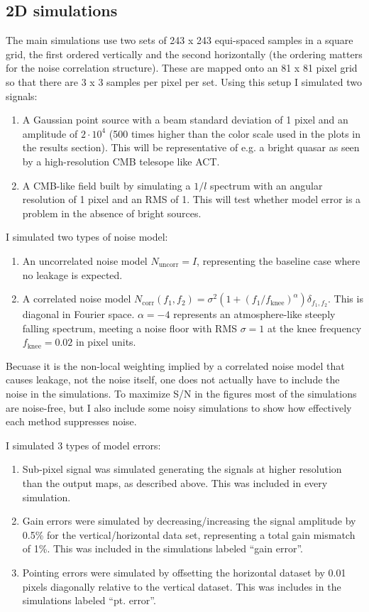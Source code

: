 \documentclass{article}
\begin{document}
\subsection{2D simulations}
The main simulations use two sets of 243 x 243 equi-spaced samples in a square grid,
the first ordered vertically and the second horizontally (the ordering matters for the
noise correlation structure). These are mapped onto an 81 x 81
pixel grid so that there are 3 x 3 samples per pixel per set. Using this setup I simulated
two signals:
\begin{enumerate}
	\item A Gaussian point source with a beam standard deviation of 1 pixel and an
amplitude of $2\cdot 10^4$ (500 times higher than the color scale used in the plots in the
results section). This will be representative of e.g. a bright quasar as seen by a high-resolution
CMB telesope like ACT.
	\item A CMB-like field built by simulating a $1/l$ spectrum with an angular
resolution of 1 pixel and an RMS of 1. This will test whether model error
is a problem in the absence of bright sources.
\end{enumerate}
I simulated two types of noise model:
\begin{enumerate}
	\item An uncorrelated noise model $N_\textrm{uncorr} = I$, representing the baseline case
		where no leakage is expected.
	\item A correlated noise model $N_\textrm{corr}(f_1,f_2) = \sigma^2 (1 + (f_1/f_\textrm{knee})^\alpha) \delta_{f_1,f_2}$. This is diagonal in Fourier space. $\alpha = -4$ represents an atmosphere-like steeply falling spectrum, meeting a noise floor with RMS $\sigma=1$ at the knee frequency $f_\textrm{knee} = 0.02$ in pixel units.
\end{enumerate}
Becuase it is the non-local weighting implied by a correlated noise model that causes leakage,
not the noise itself, one does not actually have to include the noise in the simulations.
To maximize S/N in the figures most of the simulations are noise-free, but I also include some noisy
simulations to show how effectively each method suppresses noise.

I simulated 3 types of model errors:
\begin{enumerate}
	\item Sub-pixel signal was simulated generating the signals at higher resolution than the
		output maps, as described above. This was included in every simulation.
	\item Gain errors were simulated by decreasing/increasing the signal amplitude by
	0.5\% for the vertical/horizontal data set, representing a total gain mismatch of
	1\%. This was included in the simulations labeled ``gain error''.
	\item Pointing errors were simulated by offsetting the horizontal dataset by 0.01
		pixels diagonally relative to the vertical dataset. This was includes in the
	simulations labeled ``pt. error''.
\end{enumerate}
\end{document}
